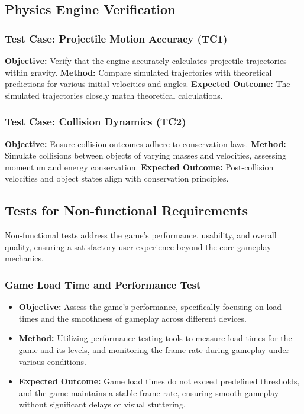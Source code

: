 \documentclass[12pt]{article}
\begin{document}
\subsection{Physics Engine Verification}
\subsubsection{Test Case: Projectile Motion Accuracy (TC1)}
\textbf{Objective:} Verify that the engine accurately calculates projectile trajectories within gravity.
\textbf{Method:} Compare simulated trajectories with theoretical predictions for various initial velocities and angles.
\textbf{Expected Outcome:} The simulated trajectories closely match theoretical calculations.

\subsubsection{Test Case: Collision Dynamics (TC2)}
\textbf{Objective:} Ensure collision outcomes adhere to conservation laws.
\textbf{Method:} Simulate collisions between objects of varying masses and velocities, assessing momentum and energy conservation.
\textbf{Expected Outcome:} Post-collision velocities and object states align with conservation principles.


\subsection{Tests for Non-functional Requirements}

Non-functional tests address the game's performance, usability, and overall quality, ensuring a satisfactory user experience beyond the core gameplay mechanics.

\subsubsection{Game Load Time and Performance Test}
\begin{itemize}
    \item \textbf{Objective:} Assess the game's performance, specifically focusing on load times and the smoothness of gameplay across different devices.
    \item \textbf{Method:} Utilizing performance testing tools to measure load times for the game and its levels, and monitoring the frame rate during gameplay under various conditions.
    \item \textbf{Expected Outcome:} Game load times do not exceed predefined thresholds, and the game maintains a stable frame rate, ensuring smooth gameplay without significant delays or visual stuttering.
\end{itemize}
\end{document}
